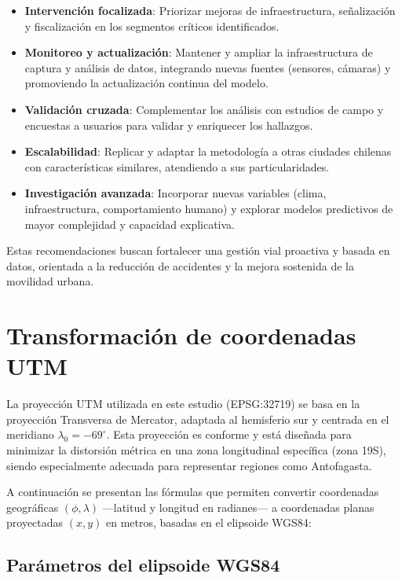\documentclass[12pt]{article}
\begin{document}
\begin{itemize}
    \item \textbf{Intervención focalizada}: Priorizar mejoras de infraestructura, señalización y fiscalización en los segmentos críticos identificados.
    \item \textbf{Monitoreo y actualización}: Mantener y ampliar la infraestructura de captura y análisis de datos, integrando nuevas fuentes (sensores, cámaras) y promoviendo la actualización continua del modelo.
    \item \textbf{Validación cruzada}: Complementar los análisis con estudios de campo y encuestas a usuarios para validar y enriquecer los hallazgos.
    \item \textbf{Escalabilidad}: Replicar y adaptar la metodología a otras ciudades chilenas con características similares, atendiendo a sus particularidades.
    \item \textbf{Investigación avanzada}: Incorporar nuevas variables (clima, infraestructura, comportamiento humano) y explorar modelos predictivos de mayor complejidad y capacidad explicativa.
\end{itemize}

Estas recomendaciones buscan fortalecer una gestión vial proactiva y basada en datos, orientada a la reducción de accidentes y la mejora sostenida de la movilidad urbana.

\newpage

\appendix
\section{Transformación de coordenadas UTM}
\label{ap:utm}

La proyección UTM utilizada en este estudio (EPSG:32719) se basa en la proyección Transversa de Mercator, adaptada al hemisferio sur y centrada en el meridiano $\lambda_0 = -69^\circ$. Esta proyección es conforme y está diseñada para minimizar la distorsión métrica en una zona longitudinal específica (zona 19S), siendo especialmente adecuada para representar regiones como Antofagasta.

A continuación se presentan las fórmulas que permiten convertir coordenadas geográficas $(\phi, \lambda)$ —latitud y longitud en radianes— a coordenadas planas proyectadas $(x, y)$ en metros, basadas en el elipsoide WGS84:

\subsection*{Parámetros del elipsoide WGS84}
\end{document}
